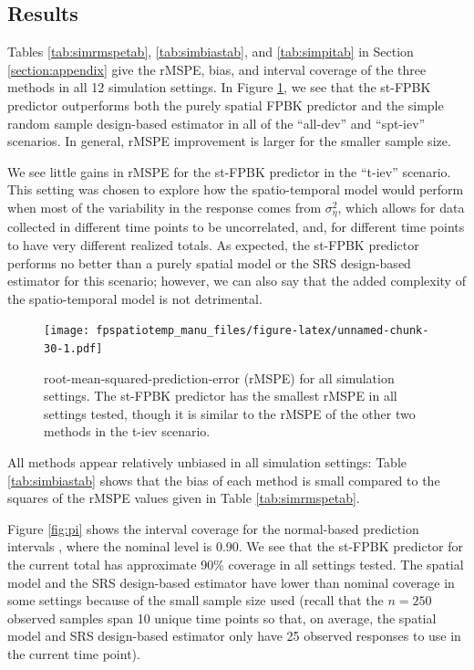\documentclass[]{interact}
\theoremstyle{plain}%
\theoremstyle{definition}
\theoremstyle{remark}
\begin{document}
\subsection{Results}

Tables \ref{tab:simrmspetab}, \ref{tab:simbiastab}, and
\ref{tab:simpitab} in Section \ref{section:appendix} give the rMSPE,
bias, and interval coverage of the three methods in all 12 simulation
settings. In Figure \ref{fig:rmspe}, we see that the st-FPBK predictor
outperforms both the purely spatial FPBK predictor and the simple random
sample design-based estimator in all of the ``all-dev'' and ``spt-iev''
scenarios. In general, rMSPE improvement is larger for the smaller
sample size.

We see little gains in rMSPE for the st-FPBK predictor in the ``t-iev''
scenario. This setting was chosen to explore how the spatio-temporal
model would perform when most of the variability in the response comes
from \(\sigma^2_{\eta}\), which allows for data collected in different
time points to be uncorrelated, and, for different time points to have
very different realized totals. As expected, the st-FPBK predictor
performs no better than a purely spatial model or the SRS design-based
estimator for this scenario; however, we can also say that the added
complexity of the spatio-temporal model is not detrimental.

\begin{figure}
\centering
\texttt{[image: fpspatiotemp\_manu\_files/figure-latex/unnamed-chunk-30-1.pdf]}
\caption{\label{fig:rmspe} root-mean-squared-prediction-error (rMSPE)
for all simulation settings. The st-FPBK predictor has the smallest
rMSPE in all settings tested, though it is similar to the rMSPE of the
other two methods in the t-iev scenario.}
\end{figure}

All methods appear relatively unbiased in all simulation settings: Table
\ref{tab:simbiastab} shows that the bias of each method is small
compared to the squares of the rMSPE values given in Table
\ref{tab:simrmspetab}.

Figure \ref{fig:pi} shows the interval coverage for the normal-based
prediction intervals \citep{smith1980central}, where the nominal level
is 0.90. We see that the st-FPBK predictor for the current total has
approximate 90\% coverage in all settings tested. The spatial model and
the SRS design-based estimator have lower than nominal coverage in some
settings because of the small sample size used (recall that the
\(n = 250\) observed samples span 10 unique time points so that, on
average, the spatial model and SRS design-based estimator only have 25
observed responses to use in the current time point).
\end{document}
